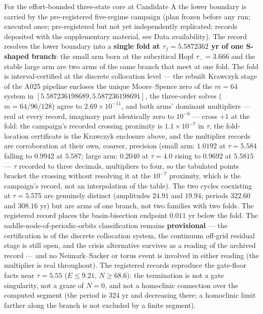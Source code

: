 \documentclass[11pt]{article}
\begin{document}
For the effort-bounded three-state core at Candidate A the lower
boundary is carried by the pre-registered five-regime campaign (plan
frozen before any run; executed once; pre-registered but not yet
independently replicated; records deposited with the supplementary
material, see Data availability). The record resolves the lower boundary
into a \textbf{single fold at \(\tau_f = 5.5872362\) yr of one S-shaped
branch}: the small arm born at the subcritical Hopf \(\tau_- = 3.666\)
and the stable large arm are two arms of the same branch that meet at
one fold. The fold is interval-certified at the discrete collocation
level --- the rebuilt Krawczyk stage of the A025 pipeline encloses the
unique Moore--Spence zero of the \(m = 64\) system in
\([5.587236198689, 5.587236198691]\), the three-order solves
(\(m = 64/96/128\)) agree to \(2.69\times10^{-11}\), and both arms'
dominant multipliers --- real at every record, imaginary part
identically zero to \(10^{-6}\) --- cross \(+1\) at the fold: the
campaign's recorded crossing proximity is \(1.1\times10^{-7}\) in
\(\tau\), the fold-location certificate is the Krawczyk enclosure above,
and the multiplier records are corroboration at their own, coarser,
precision (small arm: \(1.0192\) at \(\tau = 5.584\) falling to
\(0.9942\) at \(5.587\); large arm: \(0.2040\) at \(\tau = 4.0\) rising
to \(0.9692\) at \(5.5815\) --- \(\tau\) recorded to three decimals,
multipliers to four, so the tabulated points bracket the crossing
without resolving it at the \(10^{-7}\) proximity, which is the
campaign's record, not an interpolation of the table). The two cycles
coexisting at \(\tau = 5.575\) are genuinely distinct (amplitudes
\(24.91\) and \(19.94\); periods \(322.60\) and \(308.16\) yr) but are
arms of one branch, not two families with two folds. The registered
record places the basin-bisection endpoint \(0.011\) yr below the fold.
The saddle-node-of-periodic-orbits classification remains
\textbf{provisional} --- the certification is of the discrete
collocation system, the continuum off-grid residual stage is still open,
and the crisis alternative survives as a reading of the archived record
--- and no Neimark--Sacker or torus event is involved in either reading
(the multiplier is real throughout). The registered records reproduce
the gate-floor facts near \(\tau = 5.55\) (\(E \le 9.21\),
\(N \ge 68.6\)): the termination is not a gate singularity, not a graze
of \(N = 0\), and not a homoclinic connection over the computed segment
(the period is 324 yr and decreasing there; a homoclinic limit farther
along the branch is not excluded by a finite segment).
\end{document}
